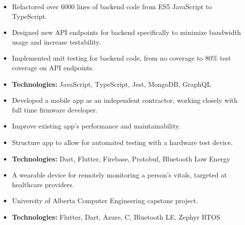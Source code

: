 \documentclass[10pt,a4paper,ragged2e,withhyper]{altacv}
\begin{document}

\makecvheader
{}
\begin{paracol}{2}

  \begin{itemize}
    \item Refactored over 6000 lines of backend code from ES5 JavaScript to TypeScript.
    \item Designed new API endpoints for backend specifically to minimize bandwidth usage and increase testability.
    \item Implemented unit testing for backend code, from no coverage to 80\% test coverage on API endpoints.
    \item \textbf{Technologies:} JavaScript, TypeScript, Jest, MongoDB, GraphQL
  \end{itemize}

  \begin{itemize}
    \item Developed a mobile app as an independent contractor, working closely with full time firmware developer.
    \item Improve existing app's performance and maintainability.
    \item Structure app to allow for automated testing with a hardware test device.
    \item \textbf{Technologies:} Dart, Flutter, Firebase, Protobuf, Bluetooth Low Energy
  \end{itemize}
  \divider\small


  \begin{itemize}
    \item A wearable device for remotely monitoring a person's vitals, targeted at healthcare providers.
    \item University of Alberta Computer Engineering capstone project.
    \item \textbf{Technologies:} Flutter, Dart, Azure, C, Bluetooth LE, Zephyr RTOS
  \end{itemize}
  \divider\small


\end{paracol}
\end{document}
